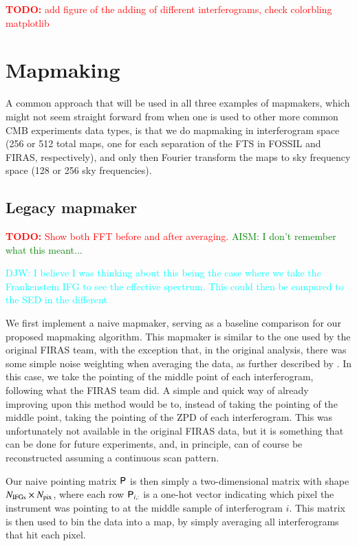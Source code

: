 \documentclass{aa}
\newcommand{\todo}[1]{\textcolor{red}{\textbf{TODO:} #1}}
\newcommand{\matP}[0]{\tens{P}}
\newcommand{\aism}[1]{\textcolor{green}{{AISM:} #1}}
\newcommand{\djw}[1]{\textcolor{cyan}{{DJW:} #1}}
\begin{document}
\todo{add figure of the adding of different interferograms, check colorbling matplotlib}

\section{Mapmaking}
\label{sec:mapmaking}

A common approach that will be used in all three examples of mapmakers, which might not seem straight forward from when one is used to other more common CMB experiments data types, is that we do mapmaking in interferogram space (256 or 512 total maps, one for each separation of the FTS in FOSSIL and FIRAS, respectively), and only then Fourier transform the maps to sky frequency space (128 or 256 sky frequencies).

\subsection{Legacy mapmaker}
\label{sec:legacy-mapmaker}

\todo{Show both FFT before and after averaging.} \aism{I don't remember what this meant...}

\djw{I believe I was thinking about this being the case where we take the Frankenstein IFG to see the effective spectrum. This could then be compared to the SED in the different }

We first implement a naive mapmaker, serving as a baseline comparison for our proposed mapmaking algorithm. This mapmaker is similar to the one used by the original FIRAS team, with the exception that, in the original analysis, there was some simple noise weighting when averaging the data, as further described by \cite{firasexsupp}. In this case, we take the pointing of the middle point of each interferogram, following what the FIRAS team did. A simple and quick way of already improving upon this method would be to, instead of taking the pointing of the middle point, taking the pointing of the ZPD of each interferogram. This was unfortunately not available in the original FIRAS data, but it is something that can be done for future experiments, and, in principle, can of course be reconstructed assuming a continuous scan pattern.

Our naive pointing matrix $\matP$ is then simply a two-dimensional matrix with shape $N_{\rm IFGs} \times N_{\rm pix}$, where each row $\matP_{i,:}$ is a one-hot vector indicating which pixel the instrument was pointing to at the middle sample of interferogram $i$. This matrix is then used to bin the data into a map, by simply averaging all interferograms that hit each pixel.
\end{document}
